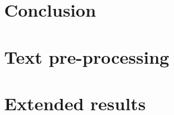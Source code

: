 \documentclass[a4paper, 12pt]{article}
\begin{document}
\section*{Conclusion}\label{r:conclusion}


\linespread{1.2}

\printbibliography

\newpage
\appendix

\linespread{1.5}

\section{Text pre-processing}\label{r:text_preparation}


\section{Extended results}\label{r:extended_results}


\newpage
\listoffigures
\listoftables

\end{document}

